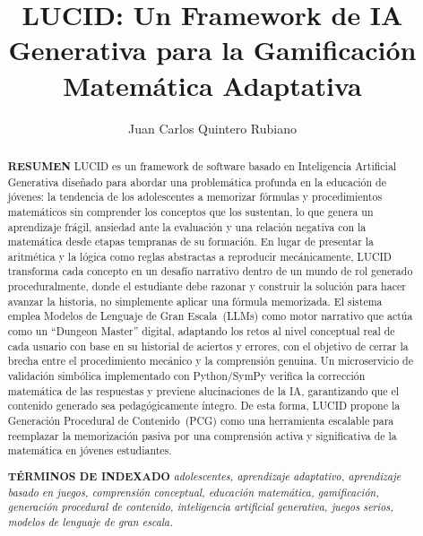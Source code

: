 \documentclass{ieeetj}
\begin{document}
\doiinfo{}


\title{LUCID: Un Framework de IA Generativa para la Gamificación Matemática Adaptativa}

\author{Juan Carlos Quintero Rubiano}


\begin{abstract}
{\abstractheadfont\bfseries\textcolor{tmlcncolor}{RESUMEN}}\hspace*{3pt}%
LUCID es un framework de software basado en Inteligencia Artificial Generativa dise\~nado para
abordar una problem\'atica profunda en la educaci\'on de j\'ovenes: la tendencia de los
adolescentes a memorizar f\'ormulas y procedimientos matem\'aticos sin comprender los conceptos
que los sustentan, lo que genera un aprendizaje fr\'agil, ansiedad ante la evaluaci\'on y una
relaci\'on negativa con la matem\'atica desde etapas tempranas de su formaci\'on.
En lugar de presentar la aritm\'etica y la l\'ogica como reglas abstractas a reproducir
mec\'anicamente, LUCID transforma cada concepto en un desaf\'io narrativo dentro de un mundo
de rol generado proceduralmente, donde el estudiante debe razonar y construir la soluci\'on
para hacer avanzar la historia, no simplemente aplicar una f\'ormula memorizada.
El sistema emplea Modelos de Lenguaje de Gran Escala~(LLMs) como motor narrativo que act\'ua
como un ``Dungeon Master'' digital, adaptando los retos al nivel conceptual real de cada
usuario con base en su historial de aciertos y errores, con el objetivo de cerrar la brecha
entre el procedimiento mec\'anico y la comprensi\'on genuina.
Un microservicio de validaci\'on simb\'olica implementado con Python/SymPy verifica la
correcci\'on matem\'atica de las respuestas y previene alucinaciones de la IA, garantizando
que el contenido generado sea pedag\'ogicamente \'integro.
De esta forma, LUCID propone la Generaci\'on Procedural de Contenido~(PCG) como una herramienta
escalable para reemplazar la memorizaci\'on pasiva por una comprensi\'on activa y significativa
de la matem\'atica en j\'ovenes estudiantes.

\smallskip\noindent
{\abstractheadfont\bfseries\textcolor{tmlcncolor}{T\'ERMINOS DE INDEXADO}}\hspace*{3pt}%
\textit{adolescentes, aprendizaje adaptativo, aprendizaje basado en juegos, comprensi\'on conceptual,
educaci\'on matem\'atica, gamificaci\'on, generaci\'on procedural de contenido,
inteligencia artificial generativa, juegos serios, modelos de lenguaje de gran escala.}


\end{abstract}
\end{document}
